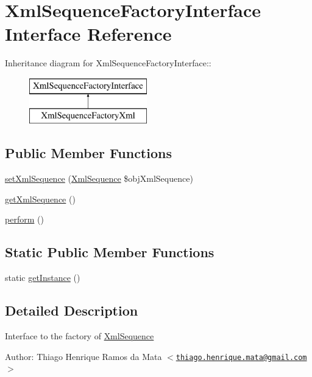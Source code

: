 \hypertarget{interface_xml_sequence_factory_interface}{
\section{XmlSequenceFactoryInterface Interface Reference}
\label{interface_xml_sequence_factory_interface}
}
Inheritance diagram for XmlSequenceFactoryInterface::\begin{figure}[H]
\begin{center}
\leavevmode
\includegraphics[height=2cm]{interface_xml_sequence_factory_interface}
\end{center}
\end{figure}
\subsection*{Public Member Functions}
\begin{CompactItemize}
\item 
\hyperlink{interface_xml_sequence_factory_interface_65967fe6cc76b0c0b28aa39e9acffcab}{setXmlSequence} (\hyperlink{class_xml_sequence}{XmlSequence} \$objXmlSequence)
\item 
\hyperlink{interface_xml_sequence_factory_interface_feb0ab0d5955fcae20ff5062fa59fd79}{getXmlSequence} ()
\item 
\hyperlink{interface_xml_sequence_factory_interface_469121070b5e6118f202517380558019}{perform} ()
\end{CompactItemize}
\subsection*{Static Public Member Functions}
\begin{CompactItemize}
\item 
static \hyperlink{interface_xml_sequence_factory_interface_c93fbec81f07e5d15f80db907e63dc10}{getInstance} ()
\end{CompactItemize}


\subsection{Detailed Description}
Interface to the factory of \hyperlink{class_xml_sequence}{XmlSequence} \begin{Desc}
\item[Author:]Thiago Henrique Ramos da Mata $<$\href{mailto:thiago.henrique.mata@gmail.com}{\tt thiago.henrique.mata@gmail.com}$>$ \end{Desc}


